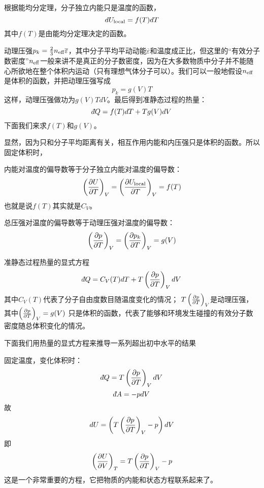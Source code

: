 \documentclass[CJK]{beamer}
\begin{document}
\begin{frame}
\bch
根据能均分定理，{\blue 分子独立内能只是温度的函数}，
$$d U_{\rm local} = f(T) dT$$
其中$f(T)$是由能均分定理决定的函数。

\skipline

动理压强$p_k = \frac{2}{3}n_{\rm eff}\overline{\varepsilon}$，其中分子平均平动动能$\overline{\varepsilon}$和温度成正比，但这里的“有效分子数密度”$n_{\rm eff}$一般来讲不是真正的分子数密度，因为在大多数物质中分子并不能随心所欲地在整个体积内运动（只有理想气体分子可以）。我们可以一般地假设$n_{\rm eff}$是体积的函数，并把动理压强写成
{\blue
$$ p_k = g(V) T$$}
这样，动理压强做功为$g(V)T dV$。最后得到准静态过程的热量：$$\dbar Q = f(T)dT + Tg(V) dV$$
下面我们来求$f(T)$和$g(V)$。

\ech
\end{frame}



\begin{frame}
\bch
显然，因为只和分子平均距离有关，{\blue 相互作用内能和内压强只是体积的函数}。所以固定体积时，

\bitem
\item{内能对温度的偏导数等于分子独立内能对温度的偏导数：
$$ \left(\frac{\partial U}{\partial T}\right)_{V} = \left(\frac{\partial U_{\rm local}}{\partial T}\right)_{V} = f(T) $$
也就是说$f(T)$其实就是$C_V$。}
\item{
总压强对温度的偏导数等于动理压强对温度的偏导数：
$$\left(\frac{\partial p}{\partial T}\right)_{V} = \left(\frac{\partial p_k}{\partial T}\right)_{V} = g(V)$$}
\eitem
\ech
\end{frame}

\begin{frame}
\bch
准静态过程热量的显式方程
\tbox
{\blue $$\dbar Q = C_V(T)dT + T \pfrac pTV dV$$}
其中$C_V(T)$代表了分子自由度数目随温度变化的情况；
$T\left(\frac{\partial p}{\partial T}\right)_{V}$是动理压强，其中$\left(\frac{\partial p}{\partial T}\right)_{V}  = g(V)$
只是体积的函数，代表了能够和环境发生碰撞的有效分子数密度随总体积变化的情况。

\ech
\end{frame}

\begin{frame}
\bch

下面我们用热量的显式方程来推导一系列超出初中水平的结果

\ech
\end{frame}


\begin{frame}
\bch
固定温度，变化体积时：
$$\dbar Q = T\pfrac pTV dV$$
$$\dbar A = -pdV$$
故
$$dU = \left(T \left(\frac{\partial p}{\partial T}\right)_{V} - p\right)dV$$
即{\blue
$$\left(\frac{\partial U}{\partial V}\right)_{T} = T \left(\frac{\partial p}{\partial T}\right)_{V} - p$$
}
这是一个非常重要的方程，它把物质的内能和状态方程联系起来了。
\ech
\end{frame}
\end{document}
